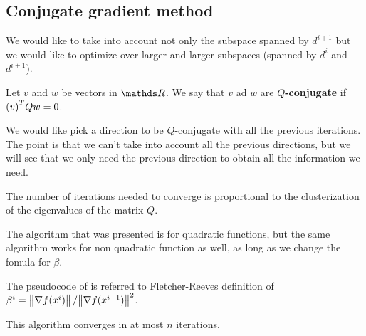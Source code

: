 \documentclass[ComputationalMathematics.tex]{subfiles}
\begin{document}
\subsection{Conjugate gradient method}



We would like to take into account not only the subspace spanned by $d^{i+1}$ but we would like to optimize over larger and larger subspaces (spanned by $d^i$ and $d^{i+1}$).

\begin{definition}[Q-conjugate]
Let $v$ and $w$ be vectors in $\R$. We say that $v$ ad $w$ are \textbf{$Q$-conjugate} if ${(v)}^{T} Q w = 0$.
\end{definition}

We would like pick a direction to be $Q$-conjugate with all the previous iterations. The point is that we can't take into account all the previous directions, but we will see that we only need the previous direction to obtain all the information we need.


The number of iterations needed to converge is proportional to the clusterization of the eigenvalues of the matrix $Q$.

The algorithm that was presented is for quadratic functions, but the same algorithm works for non quadratic function as well, as long as we change the fomula for $\beta$.

The pseudocode of  is referred to Fletcher-Reeves definition of $\beta^i = \left\lVert\nabla f(x^i)\right\rVert / {\left\lVert\nabla f(x^{i-1})\right\rVert}^2$.

This algorithm converges in at most $n$ iterations.
\end{document}

